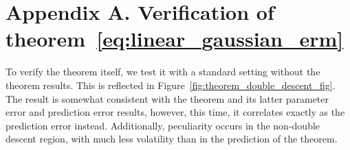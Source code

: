 \documentclass[10pt]{article} %
\begin{document}
\clearpage




\clearpage

\appendix
\section*{Appendix A. Verification of theorem~\ref{eq:linear_gaussian_erm}}

To verify the theorem itself, we test it with a standard setting without the theorem results. This is reflected in Figure~\ref{fig:theorem_double_descent_fig}. The result is somewhat consistent with the theorem and its latter parameter error and prediction error results, however, this time, it correlates exactly as the prediction error instead. Additionally, peculiarity occurs in the non-double descent region, with much less volatility than in the prediction of the theorem. 
\end{document}
